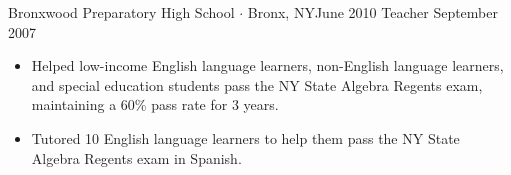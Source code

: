 \begin{experiences}
  \emptySeparator      

  \experience
  {Bronxwood Preparatory High School $\cdot$ Bronx, NY}{June 2010}
  {Teacher}
 {September 2007}   {
      \begin{itemize}
            \item Helped low-income English language learners, non-English language learners, and special education students pass the NY State Algebra Regents exam, maintaining a 60\% pass rate for 3 years. 
            \item Tutored 10 English language learners to help them pass the NY State Algebra Regents exam in Spanish.
      \end{itemize}
                  }
\end{experiences}
